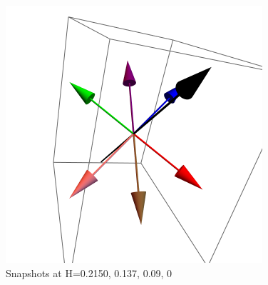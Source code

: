 \documentclass{article}
\begin{document}
\begin{figure}[ht]
\includegraphics[scale=0.22]{HVariedData/Pictures/101Dec216.png}
\caption{Snapshots at H=0.2150, 0.137, 0.09, 0}
\end{figure}

\clearpage
\end{document}
